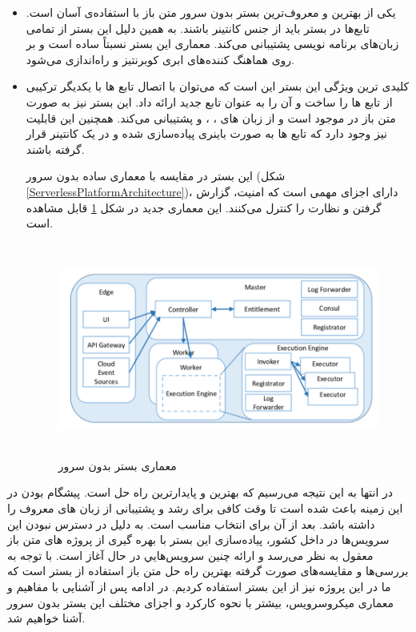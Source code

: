 \begin{itemize}
	\item \textbf{} یکی از بهترین و معروف‌ترین بستر بدون سرور متن باز با استفاده‌ی آسان است. تابع‌ها در بستر  باید از جنس کانتینر باشند. به همین دلیل این بستر از تمامی زبان‌های برنامه نویسی پشتیبانی می‌کند. معماری این بستر نسبتاً ساده است و بر روی هماهنگ کننده‌های ابری کوبرنتیز و  راه‌اندازی می‌شود.
	\cite{openfaas}
	
	\item \textbf{}  کلیدی ترین ویژگی این بستر این است که می‌توان با اتصال تابع ها با یکدیگر ترکیبی از تابع ها را ساخت و آن را به عنوان تابع جدید ارائه داد. این بستر نیز به صورت متن باز در  موجود است و از زبان های ، ،  و  پشتیبانی می‌کند. همچنین این قابلیت نیز وجود دارد که تابع ها به صورت باینری پیاده‌سازی شده و در یک کانتینر قرار گرفته باشند.
	
	این بستر در مقایسه با معماری ساده بدون سرور (شکل \ref{ServerlessPlatformArchitecture})، دارای اجزای مهمی است که امنیت، گزارش گرفتن و نظارت را کنترل می‌کنند. این معماری جدید در شکل \ref{OpenWhisk-architecture} قابل مشاهده است.
	
	\begin{figure}[!h]
		\centering
		\includegraphics[height=7cm]{images/OpenWhisk-architecture}
		\caption{معماری بستر بدون سرور }
		\label{OpenWhisk-architecture}
	\end{figure}
	
\end{itemize}

در انتها به این نتیجه می‌رسیم که بهترین و پایدارترین راه حل  است. پیشگام بودن در این زمینه باعث شده است تا وقت کافی برای رشد و پشتیبانی از زبان های معروف را داشته باشد. بعد از آن  برای انتخاب مناسب است. به دلیل در دسترس نبودن این سرویس‌ها در داخل کشور، پیاده‌سازی این بستر با بهره گیری از پروژه های متن باز معقول به نظر می‌رسد و ارائه چنين سرويس‌هايي در حال آغاز است. با توجه به بررسی‌ها و مقایسه‌های صورت گرفته بهترین راه حل متن باز استفاده از بستر  است که ما در این پروژه نیز از این بستر استفاده کردیم. در ادامه پس از آشنایی با مفاهیم و معماری میکروسرویس، بیشتر با نحوه کارکرد و اجزای مختلف این بستر بدون سرور آشنا خواهیم شد.

